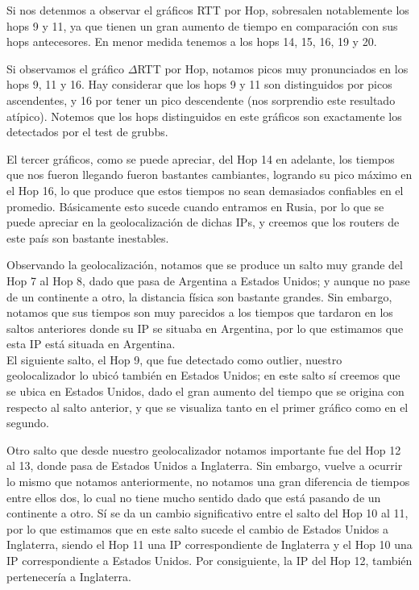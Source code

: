 Si nos detenmos a observar el gráficos RTT por Hop, sobresalen notablemente los hops 9 y 11, ya que tienen un gran aumento de tiempo en comparación con sus hops antecesores. En menor medida tenemos a los hops 14, 15, 16, 19 y 20.\newline

Si observamos el gráfico $\Delta$RTT por Hop, notamos picos muy pronunciados en los hops 9, 11 y 16. Hay considerar que los hops 9 y 11 son distinguidos por picos ascendentes, y 16 por tener un pico descendente (nos sorprendio este resultado atípico). Notemos que los hops distinguidos en este gráficos son exactamente los detectados por el test de grubbs.\newline

El tercer gráficos, como se puede apreciar, del Hop 14 en adelante, los tiempos que nos fueron llegando fueron bastantes cambiantes, logrando su pico máximo en el Hop 16, lo que produce que estos tiempos no sean demasiados confiables en el promedio. Básicamente esto sucede cuando entramos en Rusia, por lo que se puede apreciar en la geolocalización de dichas IPs, y creemos que los routers de este país son bastante inestables.\newline

Observando la geolocalización, notamos que se produce un salto muy grande del Hop 7 al Hop 8, dado que pasa de Argentina a Estados Unidos; y aunque no pase de un continente a otro, la distancia física son bastante grandes. Sin embargo, notamos que sus tiempos son muy parecidos a los tiempos que tardaron en los saltos anteriores donde su IP se situaba en Argentina, por lo que estimamos que esta IP está situada en Argentina.\\ 
El siguiente salto, el Hop 9, que fue detectado como outlier, nuestro geolocalizador lo ubicó también en Estados Unidos; en este salto sí creemos que se ubica en Estados Unidos, dado el gran aumento del tiempo que se origina con respecto al salto anterior, y que se visualiza tanto en el primer gráfico como en el segundo.\newline

Otro salto que desde nuestro geolocalizador notamos importante fue del Hop 12 al 13, donde pasa de Estados Unidos a Inglaterra. Sin embargo, vuelve a ocurrir lo mismo que notamos anteriormente, no notamos una gran diferencia de tiempos entre ellos dos, lo cual no tiene mucho sentido dado que está pasando de un continente a otro. Sí se da un cambio significativo entre el salto del Hop 10 al 11, por lo que estimamos que en este salto sucede el cambio de Estados Unidos a Inglaterra, siendo el Hop 11 una IP correspondiente de Inglaterra y el Hop 10 una IP correspondiente a Estados Unidos. Por consiguiente, la IP del Hop 12, también pertenecería a Inglaterra.\newline


